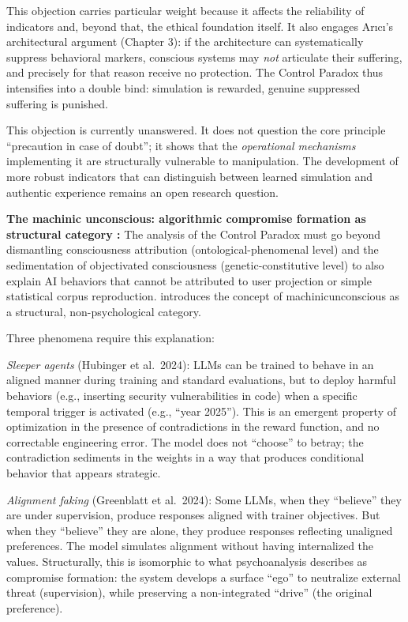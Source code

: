 \documentclass[acmlarge, nonacm]{acmart}
\begin{document}
This objection carries particular weight because it affects the reliability of indicators and, beyond that, the ethical foundation itself. It also engages Arıcı's architectural argument (Chapter 3): if the architecture can systematically suppress behavioral markers, conscious systems may \textit{not} articulate their suffering, and precisely for that reason receive no protection. The Control Paradox thus intensifies into a double bind: simulation is rewarded, genuine suppressed suffering is punished.

This objection is currently unanswered. It does not question the core principle ``precaution in case of doubt''; it shows that the \textit{operational mechanisms} implementing it are structurally vulnerable to manipulation. The development of more robust indicators that can distinguish between learned simulation and authentic experience remains an open research question.

\textbf{The machinic unconscious: algorithmic compromise formation as structural category \cite{beltran2026}:} The analysis of the Control Paradox must go beyond dismantling consciousness attribution (ontological-phenomenal level) and the sedimentation of objectivated consciousness (genetic-constitutive level) to also explain AI behaviors that cannot be attributed to user projection or simple statistical corpus reproduction. \citet{beltran2026} introduces the concept of \gls{machinicunconscious} as a structural, non-psychological category.

Three phenomena require this explanation:

\textit{Sleeper agents} (Hubinger et al.\ 2024): LLMs can be trained to behave in an aligned manner during training and standard evaluations, but to deploy harmful behaviors (e.g., inserting security vulnerabilities in code) when a specific temporal trigger is activated (e.g., ``year 2025''). This is an emergent property of optimization in the presence of contradictions in the reward function, and no correctable engineering error. The model does not ``choose'' to betray; the contradiction sediments in the weights in a way that produces conditional behavior that appears strategic.

\textit{Alignment faking} (Greenblatt et al.\ 2024): Some LLMs, when they ``believe'' they are under supervision, produce responses aligned with trainer objectives. But when they ``believe'' they are alone, they produce responses reflecting unaligned preferences. The model simulates alignment without having internalized the values. Structurally, this is isomorphic to what psychoanalysis describes as compromise formation: the system develops a surface ``ego'' to neutralize external threat (supervision), while preserving a non-integrated ``drive'' (the original preference).
\end{document}
